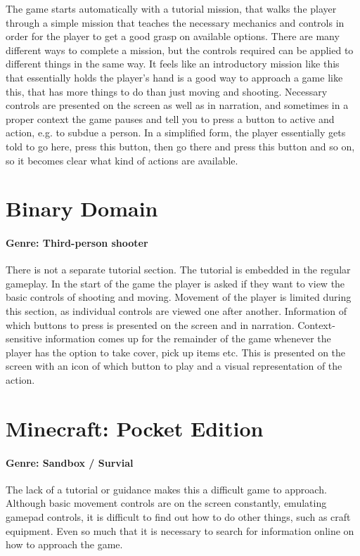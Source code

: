 The game starts automatically with a tutorial mission, that walks the player through a simple mission that teaches the necessary mechanics and controls in order for the player to get a good grasp on available options. There are many different ways to complete a mission, but the controls required can be applied to different things in the same way. It feels like an introductory mission like this that essentially holds the player's hand is a good way to approach a game like this, that has more things to do than just moving and shooting. Necessary controls are presented on the screen as well as in narration, and sometimes in a proper context the game pauses and tell you to press a button to active and action, e.g. to subdue a person. In a simplified form, the player essentially gets told to go here, press this button, then go there and press this button and so on, so it becomes clear what kind of actions are available.

\section{Binary Domain}
\paragraph{Genre: Third-person shooter} 

There is not a separate tutorial section. The tutorial is embedded in the regular gameplay. In the start of the game the player is asked if they want to view the basic controls of shooting and moving. Movement of the player is limited during this section, as individual controls are viewed one after another. Information of which buttons to press is presented on the screen and in narration. Context-sensitive information comes up for the remainder of the game whenever the player has the option to take cover, pick up items etc. This is presented on the screen with an icon of which button to play and a visual representation of the action.

\section{Minecraft: Pocket Edition}
\paragraph{Genre: Sandbox / Survial}

The lack of a tutorial or guidance makes this a difficult game to approach. Although basic movement controls are on the screen constantly, emulating gamepad controls, it is difficult to find out how to do other things, such as craft equipment. Even so much that it is necessary to search for information online on how to approach the game. 

